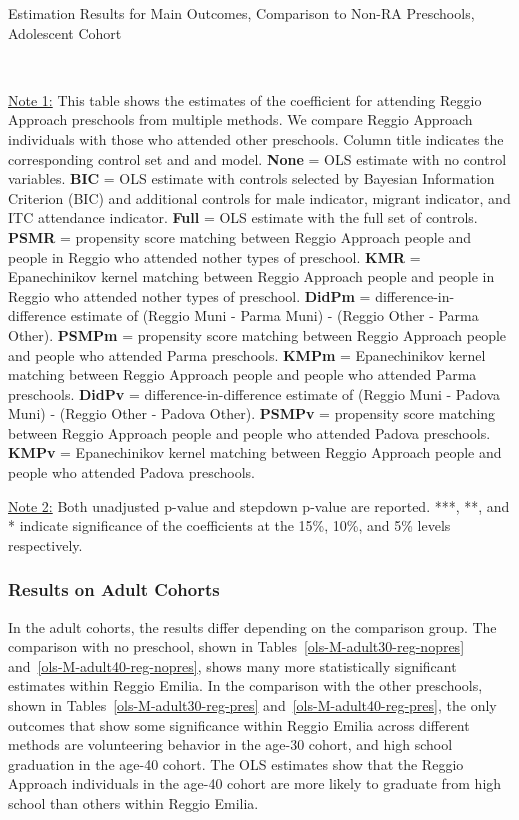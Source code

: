\begin{table}[H] \caption{Estimation Results for Main Outcomes, Comparison to Non-RA Preschools, Adolescent Cohort} \label{ols-M-adol-reg-pres}
\scalebox{0.6}{}
\vspace{1ex} \\
\footnotesize\raggedright{\underline{Note 1:} This table shows the estimates of the coefficient for attending Reggio Approach preschools from multiple methods. We compare Reggio Approach individuals with those who attended other preschools. Column title indicates the corresponding control set and and model. \textbf{None} = OLS estimate with no control variables. \textbf{BIC} = OLS estimate with controls selected by Bayesian Information Criterion (BIC) and additional controls for male indicator, migrant indicator, and ITC attendance indicator. \textbf{Full} = OLS estimate with the full set of controls. \textbf{PSMR} =  propensity score matching between Reggio Approach people and people in Reggio who attended nother types of preschool. \textbf{KMR} = Epanechinikov kernel matching between Reggio Approach people and people in Reggio who attended nother types of preschool. \textbf{DidPm} = difference-in-difference estimate of (Reggio Muni - Parma Muni) - (Reggio Other - Parma Other). \textbf{PSMPm} = propensity score matching between Reggio Approach people and people who attended Parma preschools. \textbf{KMPm} = Epanechinikov kernel matching between Reggio Approach people and people who attended Parma preschools. \textbf{DidPv} = difference-in-difference estimate of (Reggio Muni - Padova Muni) - (Reggio Other - Padova Other). \textbf{PSMPv} = propensity score matching between Reggio Approach people and people who attended Padova preschools. \textbf{KMPv} = Epanechinikov kernel matching between Reggio Approach people and people who attended Padova preschools.} 

\footnotesize\raggedright{\underline{Note 2:} Both unadjusted p-value and stepdown p-value are reported. ***, **, and * indicate significance of the coefficients at the 15\%, 10\%, and 5\% levels respectively.}
\end{table}



\subsubsection{Results on Adult Cohorts}
In the adult cohorts, the results differ depending on the comparison group. The comparison with no preschool, shown in Tables~\ref{ols-M-adult30-reg-nopres} and~\ref{ols-M-adult40-reg-nopres}, shows many more statistically significant estimates within Reggio Emilia. In the comparison with the other preschools, shown in Tables~\ref{ols-M-adult30-reg-pres} and~\ref{ols-M-adult40-reg-pres}, the only outcomes that show some significance within Reggio Emilia across different methods are volunteering behavior in the age-30 cohort, and high school graduation in the age-40 cohort. The OLS estimates show that the Reggio Approach individuals in the age-40 cohort are more likely to graduate from high school than others within Reggio Emilia. 

